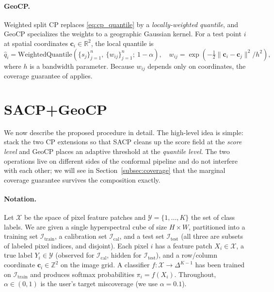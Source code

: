 \documentclass[11pt]{article}
\newcommand{\R}{\mathbb{R}}
\newcommand{\1}{\mathbf{1}}
\begin{document}
\paragraph{GeoCP.} Weighted split CP replaces \eqref{eq:cp_quantile} by a \emph{locally-weighted quantile}, and GeoCP specializes the weights to a geographic Gaussian kernel. For a test point $i$ at spatial coordinates $\mathbf{c}_i \in \R^2$, the local quantile is
\begin{equation}
    \hat{q}_i = \text{WeightedQuantile}\left(\{s_j\}_{j=1}^n,\ \{w_{ij}\}_{j=1}^n;\ 1 - \alpha\right),
    \quad w_{ij} = \exp\left(-\tfrac{1}{2}\|\mathbf{c}_i - \mathbf{c}_j\|^2 / h^2\right),
    \label{eq:geocp}
\end{equation}
where $h$ is a bandwidth parameter. Because $w_{ij}$ depends only on coordinates, the coverage guarantee of \citet{tibshirani2019conformal} applies.

\section{SACP+GeoCP}
\label{sec:method}

We now describe the proposed procedure in detail. The high-level idea is simple: stack the two CP extensions so that SACP cleans up the score field at the \emph{score level} and GeoCP places an adaptive threshold at the \emph{quantile level}. The two operations live on different sides of the conformal pipeline and do not interfere with each other; we will see in Section~\ref{subsec:coverage} that the marginal coverage guarantee survives the composition exactly.

\paragraph{Notation.} Let $\mathcal{X}$ be the space of pixel feature patches and $\mathcal{Y} = \{1, \ldots, K\}$ the set of class labels. We are given a single hyperspectral cube of size $H \times W$, partitioned into a training set $\mathcal{I}_{\text{train}}$, a calibration set $\mathcal{I}_{\text{cal}}$, and a test set $\mathcal{I}_{\text{test}}$ (all three are subsets of labeled pixel indices, and disjoint). Each pixel $i$ has a feature patch $X_i \in \mathcal{X}$, a true label $Y_i \in \mathcal{Y}$ (observed for $\mathcal{I}_{\text{cal}}$, hidden for $\mathcal{I}_{\text{test}}$), and a row/column coordinate $\mathbf{c}_i \in \mathbb{Z}^2$ on the image grid. A classifier $f : \mathcal{X} \to \Delta^{K-1}$ has been trained on $\mathcal{I}_{\text{train}}$ and produces softmax probabilities $\pi_i = f(X_i)$. Throughout, $\alpha \in (0, 1)$ is the user's target miscoverage (we use $\alpha = 0.1$).
\end{document}
